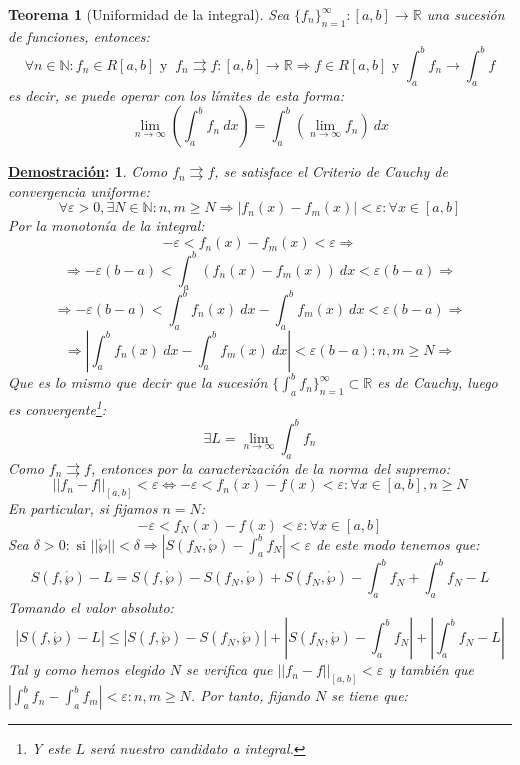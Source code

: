 \documentclass[10pt,a4paper,openright]{book}
\theoremstyle{break}
\newtheorem*{theo}{Teorema}
\newtheorem*{demo}{\underline{Demostración}:}
\newcommand{\dif}[1]{\ d#1}
\begin{document}
\begin{theo}[Uniformidad de la integral]
Sea $\{f_n\}_{n=1}^\infty : [a,b]\rightarrow \mathbb{R}$ una sucesión de funciones, entonces:
$$\forall n\in \mathbb N:  f_n\in R[a,b] \mbox{ y } \ f_n\rightrightarrows f:[a,b]\rightarrow \mathbb{R} \Rightarrow f\in R[a,b]\mbox{ y } \int_{a}^{b} f_n \rightarrow \int_{a}^{b} f$$
es decir, se puede operar con los límites de esta forma:
$$\lim_{n \rightarrow \infty} \left( \int_{a}^{b} f_n \dif{x}\right) = \int_{a}^{b} \left(\lim_{n \rightarrow \infty} f_n\right) \dif{x}$$
\end{theo}
\begin{demo}
Como $f_n \rightrightarrows f$, se satisface el Criterio de Cauchy de convergencia uniforme:
$$\forall \varepsilon >0, \exists N \in \mathbb{N} : n,m \geq N \Rightarrow |f_n (x) - f_m (x) | < \varepsilon : \forall x \in [a,b]$$
Por la monotonía de la integral:
$$- \varepsilon < f_n (x) - f_m (x) < \varepsilon \Rightarrow $$
$$\Rightarrow - \varepsilon (b - a) < \int_{a}^{b} (f_n (x) - f_m (x)) \dif{x} < \varepsilon (b - a) \Rightarrow$$
$$\Rightarrow - \varepsilon (b - a) < \int_{a}^{b} f_n (x) \dif{x} - \int_{a}^{b}  f_m (x) \dif{x} < \varepsilon (b - a) \Rightarrow$$
$$\Rightarrow \left|\int_{a}^{b} f_n (x) \dif{x} - \int_{a}^{b}  f_m (x) \dif{x}\right| <  \varepsilon (b - a) : n , m \geq N \Rightarrow$$
Que es lo mismo que decir que la sucesión $\{\int_{a}^{b} f_n\}_{n=1}^\infty \subset \mathbb{R}$ es de Cauchy, luego es convergente\footnote{Y este $L$ será nuestro candidato a integral.}:
$$\exists L = \lim_{n \to \infty} \int_{a}^{b} f_n $$
Como $f_n \rightrightarrows f$, entonces por la caracterización de la norma del supremo:
$$|| f_n - f ||_{[a,b]}  < \varepsilon \Leftrightarrow - \varepsilon < f_n (x) - f(x) < \varepsilon : \forall x \in [a,b], n \geq N $$
En particular, si fijamos $n = N $:
$$- \varepsilon < f_N (x) - f(x) < \varepsilon : \forall x \in [a,b]$$
Sea $\delta > 0 : \mbox{ si } ||\mathring{\wp} || < \delta \Rightarrow |S(f_N, \mathring{\wp}) - \int_{a}^{b} f_N| < \varepsilon$ de este modo tenemos que:
$$S(f, \mathring{\wp}) - L = S(f, \mathring{\wp}) - S(f_N, \mathring{\wp}) + S(f_N, \mathring{\wp}) - \int_{a}^{b} f_N + \int_{a}^{b} f_N - L $$
Tomando el valor absoluto:
$$|S(f, \mathring{\wp}) - L| \leq |S(f, \mathring{\wp}) - S(f_N, \mathring{\wp})| + \left|S(f_N, \mathring{\wp}) - \int_{a}^{b} f_N\right| + \left|\int_{a}^{b} f_N - L\right| $$
Tal y como hemos elegido $N$ se verifica que $|| f_n - f ||_{[a,b]}  < \varepsilon$ y también que $|\int_{a}^{b} f_n - \int_{a}^{b} f_m| < \varepsilon : n, m \geq N$. Por tanto, fijando $N$ se tiene que:

\end{demo}
\end{document}
